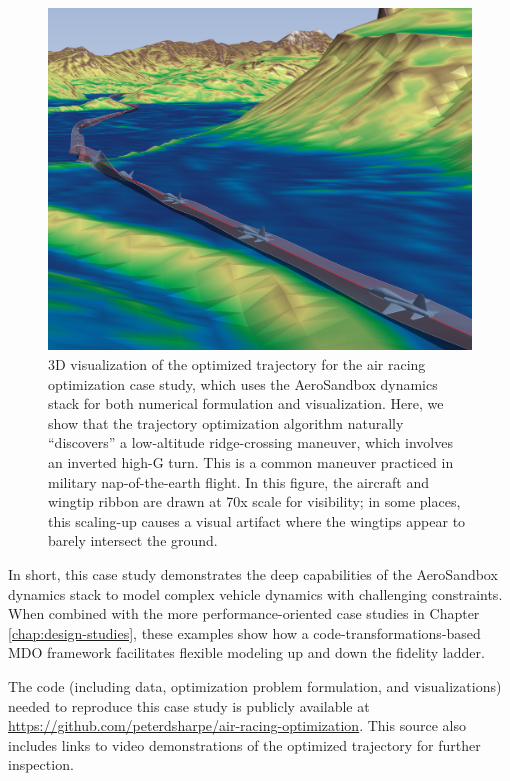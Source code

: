 \begin{figure}[H]
    \centering
    \includegraphics[width=\textwidth]{../figures/air-racing/3.png}
    \caption{3D visualization of the optimized trajectory for the air racing optimization case study, which uses the AeroSandbox dynamics stack for both numerical formulation and visualization. Here, we show that the trajectory optimization algorithm naturally ``discovers'' a low-altitude ridge-crossing maneuver, which involves an inverted high-G turn. This is a common maneuver practiced in military nap-of-the-earth flight. In this figure, the aircraft and wingtip ribbon are drawn at 70x scale for visibility; in some places, this scaling-up causes a visual artifact where the wingtips appear to barely intersect the ground.}
    \label{fig:air-racing-3}
\end{figure}

In short, this case study demonstrates the deep capabilities of the AeroSandbox dynamics stack to model complex vehicle dynamics with challenging constraints. When combined with the more performance-oriented case studies in Chapter \ref{chap:design-studies}, these examples show how a code-transformations-based MDO framework facilitates flexible modeling up and down the fidelity ladder.

The code (including data, optimization problem formulation, and visualizations) needed to reproduce this case study is publicly available at \url{https://github.com/peterdsharpe/air-racing-optimization}. This source also includes links to video demonstrations of the optimized trajectory for further inspection.


